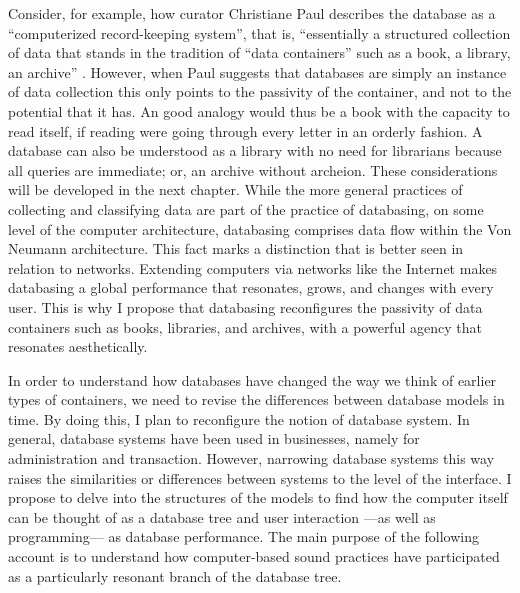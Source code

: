 Consider, for example, how curator Christiane Paul describes the database as a ``computerized record-keeping system'', that is, ``essentially a structured collection of data that stands in the tradition of ``data containers'' such as a book, a library, an archive'' \parencite[95]{Pau07:The}. However, when Paul suggests that databases are simply an instance of data collection this only points to the passivity of the container, and not to the potential that it has. An good analogy would thus be a book with the capacity to read itself, if reading were going through every letter in an orderly fashion. A database can also be understood as a library with no need for librarians because all queries are immediate; or, an archive without archeion. These considerations will be developed in the next chapter. While the more general practices of collecting and classifying data are part of the practice of databasing, on some level of the computer architecture, databasing comprises data flow within the Von Neumann architecture. This fact marks a distinction that is better seen in relation to networks. Extending computers via networks like the Internet makes databasing a global performance that resonates, grows, and changes with every user. This is why I propose that databasing reconfigures the passivity of data containers such as books, libraries, and archives, with a powerful agency that resonates aesthetically.

In order to understand how databases have changed the way we think of earlier types of containers, we need to revise the differences between database models in time. By doing this, I plan to reconfigure the notion of database system. In general, database systems have been used in businesses, namely for administration and transaction. However, narrowing database systems this way raises the similarities or differences between systems to the level of the interface. I propose to delve into the structures of the models to find how the computer itself can be thought of as a database tree and user interaction ---as well as programming--- as database performance. The main purpose of the following account is to understand how computer-based sound practices have participated as a particularly resonant branch of the database tree.

